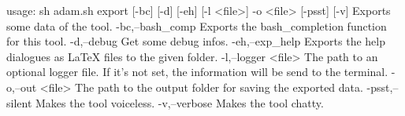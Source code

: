 usage: sh adam.sh export [-bc] [-d] [-eh] [-l <file>] -o <file> [-psst]
       [-v]
Exports some data of the tool.
 -bc,--bash_comp      Exports the bash_completion function for this tool.
 -d,--debug           Get some debug infos.
 -eh,--exp_help       Exports the help dialogues as LaTeX files to the
                      given folder.
 -l,--logger <file>   The path to an optional logger file. If it's not
                      set, the information will be send to the terminal.
 -o,--out <file>      The path to the output folder for saving the
                      exported data.
 -psst,--silent       Makes the tool voiceless.
 -v,--verbose         Makes the tool chatty.
